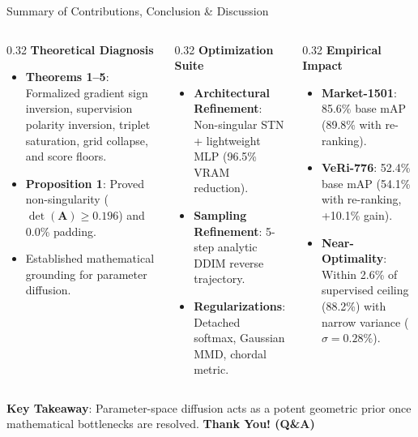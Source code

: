 \documentclass[aspectratio=169,xcolor=dvipsnames]{beamer}
\begin{document}
\begin{frame}{Summary of Contributions, Conclusion \& Discussion}
\begin{columns}[t,onlytextwidth]
\begin{column}{0.32\textwidth}
    \footnotesize
    \textbf{Theoretical Diagnosis}
    \begin{itemize}
        \setlength{\itemsep}{0.12em}
        \scriptsize
        \item \textbf{Theorems 1--5}: Formalized gradient sign inversion, supervision polarity inversion, triplet saturation, grid collapse, and score floors.
        \item \textbf{Proposition 1}: Proved non-singularity ($\det(\mathbf{A}) \ge 0.196$) and 0.0\% padding.
        \item Established mathematical grounding for parameter diffusion.
    \end{itemize}
\end{column}
\begin{column}{0.32\textwidth}
    \footnotesize
    \textbf{Optimization Suite}
    \begin{itemize}
        \setlength{\itemsep}{0.12em}
        \scriptsize
        \item \textbf{Architectural Refinement}: Non-singular STN + lightweight MLP (96.5\% VRAM reduction).
        \item \textbf{Sampling Refinement}: 5-step analytic DDIM reverse trajectory.
        \item \textbf{Regularizations}: Detached softmax, Gaussian MMD, chordal metric.
    \end{itemize}
\end{column}
\begin{column}{0.32\textwidth}
    \footnotesize
    \textbf{Empirical Impact}
    \begin{itemize}
        \setlength{\itemsep}{0.12em}
        \scriptsize
        \item \textbf{Market-1501}: 85.6\% base mAP (89.8\% with re-ranking).
        \item \textbf{VeRi-776}: 52.4\% base mAP (54.1\% with re-ranking, +10.1\% gain).
        \item \textbf{Near-Optimality}: Within 2.6\% of supervised ceiling (88.2\%) with narrow variance ($\sigma=0.28\%$).
    \end{itemize}
\end{column}
\end{columns}

\vspace{0.4em}
\footnotesize
\textbf{Key Takeaway}: Parameter-space diffusion acts as a potent geometric prior once mathematical bottlenecks are resolved. \hfill \textbf{Thank You! (Q\&A)}
\end{frame}
\end{document}
